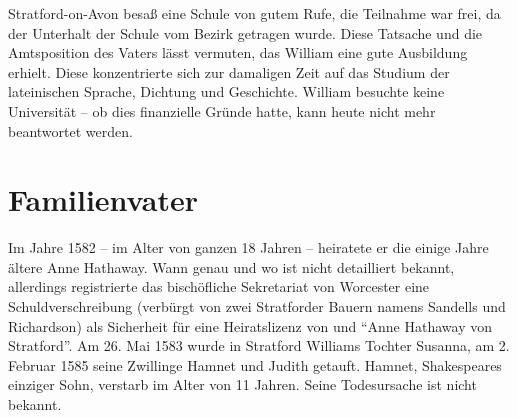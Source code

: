 Stratford-on-Avon besaß eine Schule von gutem Rufe, die Teilnahme war frei, da
der Unterhalt der Schule vom Bezirk getragen wurde. Diese Tatsache und die
Amtsposition des Vaters lässt vermuten, das William eine gute Ausbildung
erhielt. Diese konzentrierte sich zur damaligen Zeit auf das Studium der
lateinischen Sprache, Dichtung und Geschichte. William besuchte keine
Universität -- ob dies finanzielle Gründe hatte, kann heute nicht mehr
beantwortet werden.

\section{Familienvater}

Im Jahre 1582 -- im Alter von ganzen 18 Jahren -- heiratete er die einige Jahre
ältere Anne Hathaway. Wann genau und wo ist nicht detailliert bekannt,
allerdings registrierte das bischöfliche Sekretariat von Worcester eine
Schuldverschreibung (verbürgt von zwei Stratforder Bauern namens Sandells und
Richardson) als Sicherheit für eine Heiratslizenz von \WS und
"`Anne Hathaway von Stratford"'. Am 26. Mai 1583 wurde in Stratford Williams
Tochter Susanna, am 2. Februar 1585 seine Zwillinge Hamnet und Judith getauft.
Hamnet, Shakespeares einziger Sohn, verstarb im Alter von 11 Jahren. Seine
Todesursache ist nicht bekannt.
